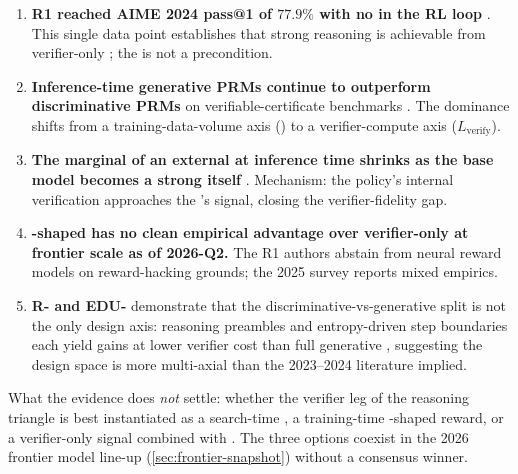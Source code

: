 \begin{enumerate}
\item \textbf{R1 reached AIME 2024 pass@1 of $77.9\%$ with no  in
the RL loop} \citep[\S 2.3]{deepseek-r1}. This single data point
establishes that strong reasoning is achievable from verifier-only
; the  is not a precondition.
\item \textbf{Inference-time generative PRMs continue to outperform
discriminative PRMs} on verifiable-certificate benchmarks
\citep[abstract]{thinkprm2025}. The dominance shifts from a
training-data-volume axis () to a verifier-compute axis
($L_{\text{verify}}$).
\item \textbf{The marginal  of an external  at inference time
shrinks as the base model becomes a strong  itself}
\citep{zheng2025-prm-survey}. Mechanism: the policy's internal
verification approaches the 's signal, closing the
verifier-fidelity gap.
\item \textbf{-shaped  has no clean empirical advantage over
verifier-only  at frontier scale as of 2026-Q2.} The R1 authors
abstain from neural reward models on reward-hacking grounds; the
2025 survey reports mixed empirics.
\item \textbf{R- and EDU-} \citep{she2025-r-prm,cao2025-edu-prm}
demonstrate that the discriminative-vs-generative split is not the
only  design axis: reasoning preambles and entropy-driven step
boundaries each yield gains at lower verifier cost than full
generative , suggesting the design space is more
multi-axial than the 2023--2024 literature
implied.
\end{enumerate}

What the evidence does \emph{not} settle: whether the verifier leg of
the reasoning triangle is best instantiated as a search-time , a
training-time -shaped reward, or a verifier-only  signal
combined with . The three options coexist in the 2026
frontier model line-up (\cref{sec:frontier-snapshot}) without a
consensus winner.

